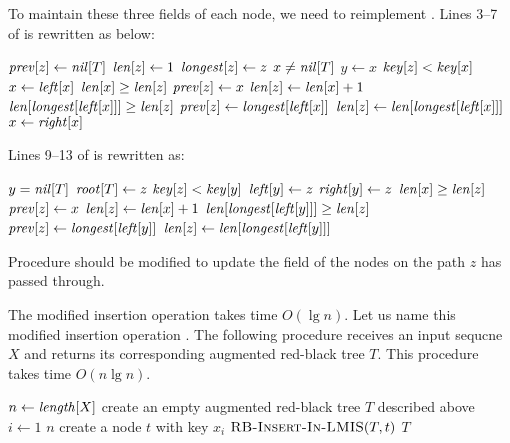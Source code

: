 \documentclass[a4paper, fleqn]{article}
\begin{document}
To maintain these three fields of each node, we need to reimplement
. Lines 3--7 of  is rewritten as
below:

\begin{codebox}
\li $\id{prev}[z] \gets \id{nil}[T]$
\li $\id{len}[z] \gets 1$
\li $\id{longest}[z] \gets z$
\li \While $x \neq \id{nil}[T]$
\li   \Do
        $y \gets x$
\li     \If $\id{key}[z] < \id{key}[x]$
\li       \Then
            $x \gets \id{left}[x]$
\li       \Else
            \If $\id{len}[x] \geq \id{len}[z]$
\li           \Then
                $\id{prev}[z] \gets x$
\li             $\id{len}[z] \gets \id{len}[x] + 1$
              \End
\li         \If $\id{len}[\id{longest}[\id{left}[x]]] \geq \id{len}[z]$
\li           \Then
                $\id{prev}[z] \gets \id{longest}[\id{left}[x]]$
\li             $\id{len}[z] \gets \id{len}[\id{longest}[\id{left}[x]]]$
              \End
\li         $x \gets \id{right}[x]$
          \End
      \End
\end{codebox}

Lines 9--13 of  is rewritten as:

\begin{codebox}
\li \If $y = \id{nil}[T]$
\li   \Then
        $\id{root}[T] \gets z$
\li   \Else
        \If $\id{key}[z] < \id{key}[y]$
\li       \Then
            $\id{left}[y] \gets z$
\li       \Else
            $\id{right}[y] \gets z$
\li         \If $\id{len}[x] \geq \id{len}[z]$
\li           \Then
                $\id{prev}[z] \gets x$
\li             $\id{len}[z] \gets \id{len}[x] + 1$
              \End
\li         \If $\id{len}[\id{longest}[\id{left}[y]]] \geq \id{len}[z]$
\li           \Then
                $\id{prev}[z] \gets \id{longest}[\id{left}[y]]$
\li             $\id{len}[z] \gets \id{len}[\id{longest}[\id{left}[y]]]$
              \End
          \End
      \End
\end{codebox}

Procedure  should be modified to update the
 field of the nodes on the path $z$ has passed through.

The modified insertion operation takes time $O(\lg n)$. Let us name
this modified insertion operation . The
following procedure  receives an input sequcne $X$ and
returns its corresponding augmented red-black tree $T$.  This
procedure takes time $O(n \lg n)$.

\begin{codebox}
\li $n \gets \id{length}[X]$
\li create an empty augmented red-black tree $T$ described above
\li \For $i \gets 1$ \To $n$
\li   \Do
        create a node $t$ with key $x_i$
\li     $\textnormal{\scshape RB-Insert-In-LMIS}(T,t)$
      \End
\li \Return $T$
\end{codebox}
\end{document}
